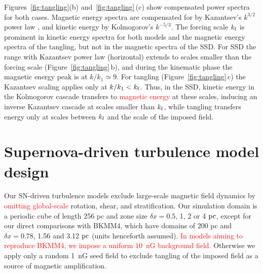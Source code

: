\documentclass[preprint2]{aastex63}
\newcommand\kf{k_{\rm f} }
\newcommand\pc{~ {\rm pc}}
\newcommand\dx{ {\delta x}}
\newcommand\BKM{{\sf BKMM4}}
\newcommand{\fg}[1]{\textcolor{midgreen}{#1}}
\newcommand{\mm}[1]{\textcolor{mypurple}{#1}}
\newcommand{\mjk}[1]{\textcolor{red}{#1}}
\begin{document}
 \fg{Figures~\ref{fig:tangling}(b) and~\ref{fig:tangling}\,(c) show
 compensated power spectra for both cases.}
 Magnetic energy spectra are compensated \fg{for by} Kazantsev's $k^{3/2}$
 \fg{power law} \citep{Sch02,BS14}, and kinetic energy \fg{by} Kolmogorov's
 $k^{-5/3}$.
 The forcing scale $\kf$ is \fg{prominent} in kinetic energy \fg{spectra for
 both models} and the magnetic energy \fg{spectra of the tangling}, but
 \fg{not} \fg{in the magnetic spectra of the SSD}.
 \fg{For SSD the range with Kazantsev power law (horizontal) extends to scales
 smaller than the forcing scale (Figure~\ref{fig:tangling}\,b), and during the
 kinematic phase the magnetic energy peak is at $k/k_1\simeq9$.}
 \fg{For tangling (Figure~\ref{fig:tangling}\,c) the Kazantsev
 \fg{scaling} applies only at $k/k_1<\kf$.} 
 Thus, in the SSD, kinetic energy \fg{in the Kolmogorov cascade} transfers to
 \mjk{magnetic energy} 
 at these scales, inducing an inverse Kazantsev \fg{cascade}
 at scales \fg{smaller than} $\kf$, while tangling transfers energy only at
 scales between $\kf$ and the scale of the imposed field.
 
\section{\fg{Supernova-driven} turbulence model design} \label{sec:model}

 \fg{Our} SN-driven turbulence models exclude large-scale magnetic field
 dynamics by \mjk{omitting global-scale} rotation, shear, and stratification.
 Our simulation domain is a periodic cube of length 256 pc and zone size
 $\dx=0.5$, 1, 2 or 4$\pc$\fg{, except for \fg{our} direct comparisons with
 \BKM, \fg{ which have} domains \fg{of} 200 pc and $\dx=0.78$, 1.56 and
 3.12$\pc$ (units henceforth assumed)}.
 \mjk{In models aiming to reproduce \BKM, we impose a uniform $10$~nG 
 background field.}
 \fg{Otherwise we apply only a} random 1~nG seed field \fg{to} exclude
 tangling of \fg{the} imposed field \mm{as} a source of magnetic amplification.
\end{document}
